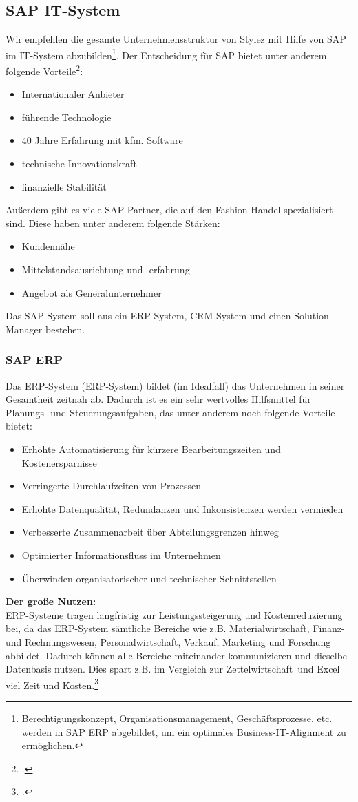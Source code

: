 \subsection{SAP IT-System}
Wir empfehlen die gesamte Unternehmensstruktur von Stylez mit Hilfe von SAP im IT-System abzubilden\footnote{Berechtigungskonzept, Organisationsmanagement, Geschäftsprozesse, etc. werden in SAP ERP abgebildet, um ein optimales Business-IT-Alignment zu ermöglichen.}. Der Entscheidung für SAP bietet unter anderem folgende Vorteile\footcite[Online im Internet.]{SAP_Vorteil}:
\begin{itemize}
\item Internationaler Anbieter
\item führende Technologie
\item 40 Jahre Erfahrung mit kfm. Software
\item technische Innovationskraft
\item finanzielle Stabilität
\end{itemize}
Außerdem gibt es viele SAP-Partner, die auf den Fashion-Handel spezialisiert sind. Diese haben unter anderem folgende Stärken:
\begin{itemize}
\item Kundennähe
\item Mittelstandsausrichtung und -erfahrung
\item Angebot als Generalunternehmer
\end{itemize}
Das SAP System soll aus ein \acrshort{ERP}-System, \acrshort{CRM}-System und einen Solution Manager bestehen.
\subsubsection{SAP ERP}
Das \acrlong{ERP}-System (ERP-System) bildet (im Idealfall) das Unternehmen in seiner Gesamtheit zeitnah ab. Dadurch ist es ein sehr wertvolles Hilfsmittel für Planungs- und Steuerungsaufgaben, das unter anderem noch folgende Vorteile bietet:
\begin{itemize}
\item Erhöhte Automatisierung für kürzere Bearbeitungszeiten und Kostenersparnisse
\item Verringerte Durchlaufzeiten von Prozessen
\item Erhöhte Datenqualität, Redundanzen und Inkonsistenzen werden vermieden
\item Verbesserte Zusammenarbeit über Abteilungsgrenzen hinweg
\item Optimierter Informationsfluss im Unternehmen
\item Überwinden organisatorischer und technischer Schnittstellen
\end{itemize}
\underline{\textbf{Der große Nutzen:}}\\
ERP-Systeme tragen langfristig zur Leistungssteigerung und Kostenreduzierung bei, da das ERP-System sämtliche Bereiche wie z.B. Materialwirtschaft, Finanz- und Rechnungswesen, Personalwirtschaft, Verkauf, Marketing und Forschung abbildet. Dadurch können alle Bereiche miteinander kommunizieren und dieselbe Datenbasis nutzen. Dies spart z.B. im Vergleich zur \glqq Zettelwirtschaft\grqq~und Excel viel Zeit und Kosten.\footcite[vgl.][Online im Internet.]{ERP}
